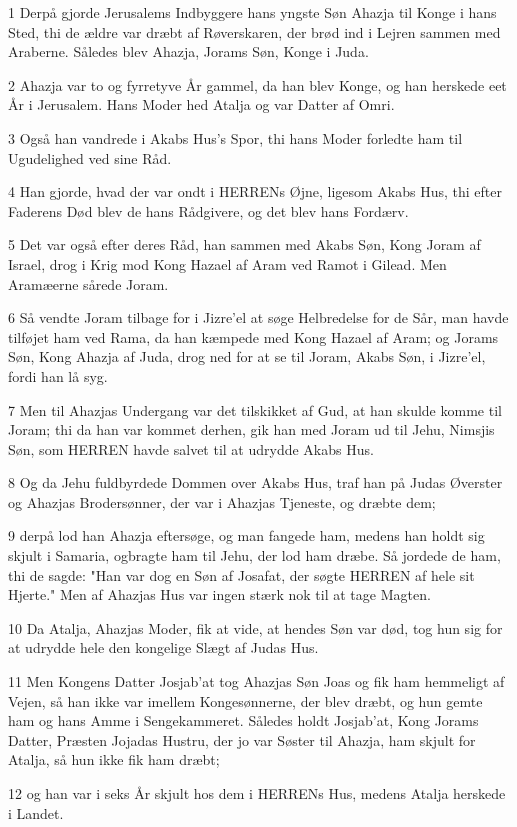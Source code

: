 \par 1 Derpå gjorde Jerusalems Indbyggere hans yngste Søn Ahazja til Konge i hans Sted, thi de ældre var dræbt af Røverskaren, der brød ind i Lejren sammen med Araberne. Således blev Ahazja, Jorams Søn, Konge i Juda.
\par 2 Ahazja var to og fyrretyve År gammel, da han blev Konge, og han herskede eet År i Jerusalem. Hans Moder hed Atalja og var Datter af Omri.
\par 3 Også han vandrede i Akabs Hus's Spor, thi hans Moder forledte ham til Ugudelighed ved sine Råd.
\par 4 Han gjorde, hvad der var ondt i HERRENs Øjne, ligesom Akabs Hus, thi efter Faderens Død blev de hans Rådgivere, og det blev hans Fordærv.
\par 5 Det var også efter deres Råd, han sammen med Akabs Søn, Kong Joram af Israel, drog i Krig mod Kong Hazael af Aram ved Ramot i Gilead. Men Aramæerne sårede Joram.
\par 6 Så vendte Joram tilbage for i Jizre'el at søge Helbredelse for de Sår, man havde tilføjet ham ved Rama, da han kæmpede med Kong Hazael af Aram; og Jorams Søn, Kong Ahazja af Juda, drog ned for at se til Joram, Akabs Søn, i Jizre'el, fordi han lå syg.
\par 7 Men til Ahazjas Undergang var det tilskikket af Gud, at han skulde komme til Joram; thi da han var kommet derhen, gik han med Joram ud til Jehu, Nimsjis Søn, som HERREN havde salvet til at udrydde Akabs Hus.
\par 8 Og da Jehu fuldbyrdede Dommen over Akabs Hus, traf han på Judas Øverster og Ahazjas Brodersønner, der var i Ahazjas Tjeneste, og dræbte dem;
\par 9 derpå lod han Ahazja eftersøge, og man fangede ham, medens han holdt sig skjult i Samaria, ogbragte ham til Jehu, der lod ham dræbe. Så jordede de ham, thi de sagde: "Han var dog en Søn af Josafat, der søgte HERREN af hele sit Hjerte." Men af Ahazjas Hus var ingen stærk nok til at tage Magten.
\par 10 Da Atalja, Ahazjas Moder, fik at vide, at hendes Søn var død, tog hun sig for at udrydde hele den kongelige Slægt af Judas Hus.
\par 11 Men Kongens Datter Josjab'at tog Ahazjas Søn Joas og fik ham hemmeligt af Vejen, så han ikke var imellem Kongesønnerne, der blev dræbt, og hun gemte ham og hans Amme i Sengekammeret. Således holdt Josjab'at, Kong Jorams Datter, Præsten Jojadas Hustru, der jo var Søster til Ahazja, ham skjult for Atalja, så hun ikke fik ham dræbt;
\par 12 og han var i seks År skjult hos dem i HERRENs Hus, medens Atalja herskede i Landet.

